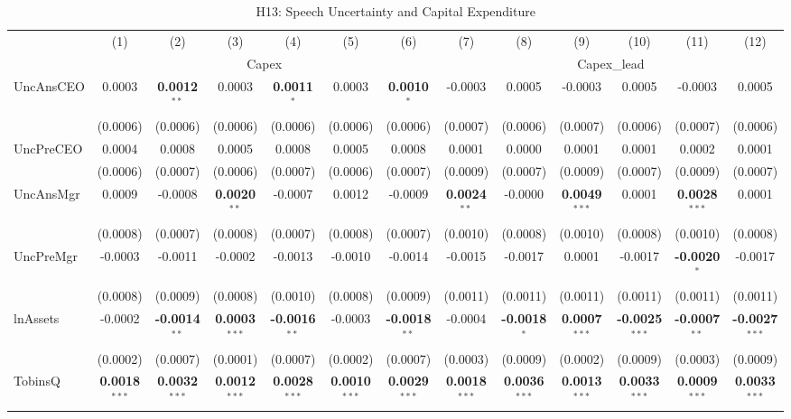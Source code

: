 \documentclass[11pt,a4paper]{article}
\begin{document}
\clearpage
\begin{table}[htbp]
\centering
\caption{H13: Speech Uncertainty and Capital Expenditure}
\label{tab:h13}
\scriptsize
\begin{tabular}{lcccccccccccc}
\toprule
 & (1) & (2) & (3) & (4) & (5) & (6) & (7) & (8) & (9) & (10) & (11) & (12) \\
 & \multicolumn{6}{c}{Capex} & \multicolumn{6}{c}{Capex\_lead} \\
\cmidrule(lr){2-7} \cmidrule(lr){8-13}
\midrule
UncAnsCEO & 0.0003 & \textbf{0.0012}$^{**}$ & 0.0003 & \textbf{0.0011}$^{*}$ & 0.0003 & \textbf{0.0010}$^{*}$ & -0.0003 & 0.0005 & -0.0003 & 0.0005 & -0.0003 & 0.0005 \\
 & (0.0006) & (0.0006) & (0.0006) & (0.0006) & (0.0006) & (0.0006) & (0.0007) & (0.0006) & (0.0007) & (0.0006) & (0.0007) & (0.0006) \\
UncPreCEO & 0.0004 & 0.0008 & 0.0005 & 0.0008 & 0.0005 & 0.0008 & 0.0001 & 0.0000 & 0.0001 & 0.0001 & 0.0002 & 0.0001 \\
 & (0.0006) & (0.0007) & (0.0006) & (0.0007) & (0.0006) & (0.0007) & (0.0009) & (0.0007) & (0.0009) & (0.0007) & (0.0009) & (0.0007) \\
UncAnsMgr & 0.0009 & -0.0008 & \textbf{0.0020}$^{**}$ & -0.0007 & 0.0012 & -0.0009 & \textbf{0.0024}$^{**}$ & -0.0000 & \textbf{0.0049}$^{***}$ & 0.0001 & \textbf{0.0028}$^{***}$ & 0.0001 \\
 & (0.0008) & (0.0007) & (0.0008) & (0.0007) & (0.0008) & (0.0007) & (0.0010) & (0.0008) & (0.0010) & (0.0008) & (0.0010) & (0.0008) \\
UncPreMgr & -0.0003 & -0.0011 & -0.0002 & -0.0013 & -0.0010 & -0.0014 & -0.0015 & -0.0017 & 0.0001 & -0.0017 & \textbf{-0.0020}$^{*}$ & -0.0017 \\
 & (0.0008) & (0.0009) & (0.0008) & (0.0010) & (0.0008) & (0.0009) & (0.0011) & (0.0011) & (0.0011) & (0.0011) & (0.0011) & (0.0011) \\
\midrule
lnAssets & -0.0002 & \textbf{-0.0014}$^{**}$ & \textbf{0.0003}$^{***}$ & \textbf{-0.0016}$^{**}$ & -0.0003 & \textbf{-0.0018}$^{**}$ & -0.0004 & \textbf{-0.0018}$^{*}$ & \textbf{0.0007}$^{***}$ & \textbf{-0.0025}$^{***}$ & \textbf{-0.0007}$^{**}$ & \textbf{-0.0027}$^{***}$ \\
 & (0.0002) & (0.0007) & (0.0001) & (0.0007) & (0.0002) & (0.0007) & (0.0003) & (0.0009) & (0.0002) & (0.0009) & (0.0003) & (0.0009) \\
TobinsQ & \textbf{0.0018}$^{***}$ & \textbf{0.0032}$^{***}$ & \textbf{0.0012}$^{***}$ & \textbf{0.0028}$^{***}$ & \textbf{0.0010}$^{***}$ & \textbf{0.0029}$^{***}$ & \textbf{0.0018}$^{***}$ & \textbf{0.0036}$^{***}$ & \textbf{0.0013}$^{***}$ & \textbf{0.0033}$^{***}$ & \textbf{0.0009}$^{***}$ & \textbf{0.0033}$^{***}$ \\

\end{tabular}
\end{table}
\end{document}
